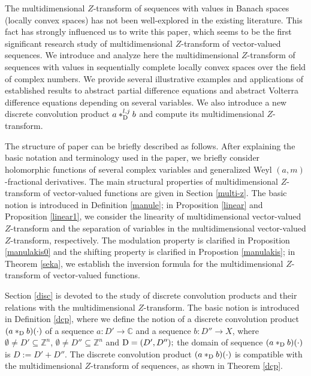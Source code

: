 \documentclass{amsart}
\theoremstyle{definition}
\theoremstyle{remark}
\numberwithin{equation}{section}
\begin{document}
The multidimensional $Z$-transform of sequences with values in Banach spaces (locally convex spaces) has not been well-explored in the existing literature. This fact has strongly influenced us to write this paper, which seems to be the first significant research study of multidimensional $Z$-transform of vector-valued sequences. We introduce and analyze here the multidimensional $Z$-transform of sequences with values in sequentially complete locally convex spaces over the field of complex numbers. We provide several illustrative examples and applications of established results to abstract partial difference equations and abstract Volterra difference equations depending on several variables. We also introduce a new discrete convolution product $a\ast_{{\rm D}}^{l,j}b$ and compute its multidimensional $Z$-transform.

The structure of paper can be briefly described as follows. After explaining the basic notation and terminology used in the paper, we briefly consider holomorphic functions of several complex variables and generalized Weyl $(a,m)$-fractional derivatives. The main structural properties of multidimensional $Z$-transform of vector-valued functions are given in Section \ref{multi-z}. The basic notion is introduced in Definition \ref{manule}; in Proposition \ref{linear} and Proposition \ref{linear1}, we consider the linearity of multidimensional vector-valued $Z$-transform and the separation of variables in the multidimensional vector-valued $Z$-transform, respectively. 
The modulation property is clarified in Proposition \ref{manulakis0} and the shifting property is clarified in Propostion \ref{manulakis}; in Theorem \ref{seka}, we establish the inversion formula for the multidimensional $Z$-transform of vector-valued functions. 

Section \ref{disc} is devoted to the study of discrete convolution products and their relations with the multidimensional $Z$-transform. The basic notion is introduced in Definition \ref{dcp}, where we define the notion of a discrete convolution product $(a \ast_{{\rm D}} b)(\cdot)$ of a sequence $a:D' \rightarrow {\mathbb C}$ and a sequence $b: D'' \rightarrow X$, where $\emptyset \neq D' \subseteq {\mathbb Z}^{n}$, $\emptyset \neq D'' \subseteq {\mathbb Z}^{n}$ and ${\rm D}=(D',D'');$ the domain of sequence $(a \ast_{{\rm D}} b)(\cdot)$ is $D:=D'+D''$. The discrete convolution product $(a \ast_{{\rm D}} b)(\cdot)$ is compatible with the multidimensional $Z$-transform of sequences, as shown in Theorem \ref{dcp}. 
\end{document}
